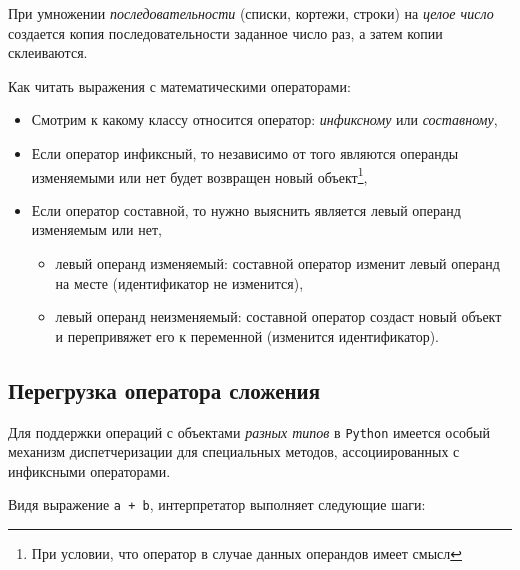\documentclass[%
	11pt,
	a4paper,
	utf8,
		]{article}
\begin{document}
При умножении \emph{последовательности} (списки, кортежи, строки) на \emph{целое число} создается копия последовательности заданное число раз, а затем копии склеиваются. 

Как читать выражения с математическими операторами:
\begin{itemize}
	\item Смотрим к какому классу относится оператор: \emph{инфиксному} или \emph{составному},
	
	\item Если оператор инфиксный, то независимо от того являются операнды изменяемыми или нет будет возвращен новый объект\footnote{При условии, что оператор в случае данных операндов имеет смысл},
	
	\item Если оператор составной, то нужно выяснить является левый операнд изменяемым или нет,
	\begin{itemize}
		\item левый операнд изменяемый: составной оператор изменит левый операнд на месте (идентификатор не изменится),
		
		\item левый операнд неизменяемый: составной оператор создаст новый объект и перепривяжет его к переменной (изменится идентификатор).
	\end{itemize}
\end{itemize}

\subsection{Перегрузка оператора сложения}

Для поддержки операций с объектами \emph{разных типов} в \texttt{Python} имеется особый механизм диспетчеризации для специальных методов, ассоциированных с инфиксными операторами.

Видя выражение \texttt{a + b}, интерпретатор выполняет следующие шаги:
\end{document}
